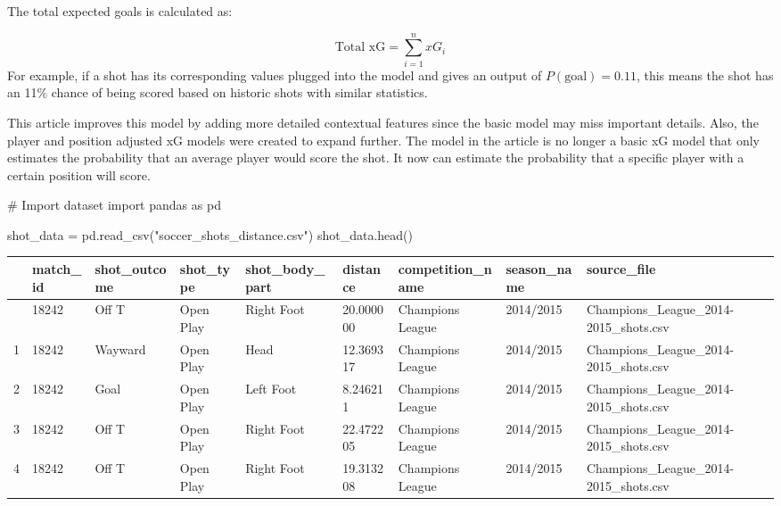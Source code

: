 \documentclass[
  11pt,
  letterpaper,
  DIV=11,
  numbers=noendperiod]{scrartcl}
\newenvironment{Shaded}{\begin{snugshade}}{\end{snugshade}}
\newcommand{\CommentTok}[1]{\textcolor[rgb]{0.37,0.37,0.37}{#1}}
\newcommand{\ImportTok}[1]{\textcolor[rgb]{0.00,0.46,0.62}{#1}}
\newcommand{\NormalTok}[1]{\textcolor[rgb]{0.00,0.23,0.31}{#1}}
\newcommand{\OperatorTok}[1]{\textcolor[rgb]{0.37,0.37,0.37}{#1}}
\newcommand{\StringTok}[1]{\textcolor[rgb]{0.13,0.47,0.30}{#1}}
\begin{document}
The total expected goals is calculated as:

\[
\text{Total xG} = \sum_{i=1}^{n} xG_i
\] For example, if a shot has its corresponding values plugged into the
model and gives an output of \(P(\text{goal}) = 0.11\), this means the
shot has an 11\% chance of being scored based on historic shots with
similar statistics.

This article improves this model by adding more detailed contextual
features since the basic model may miss important details. Also, the
player and position adjusted xG models were created to expand further.
The model in the article is no longer a basic xG model that only
estimates the probability that an average player would score the shot.
It now can estimate the probability that a specific player with a
certain position will score.

\begin{Shaded}
\begin{Highlighting}[]
\CommentTok{\# Import dataset}
\ImportTok{import}\NormalTok{ pandas }\ImportTok{as}\NormalTok{ pd}

\NormalTok{shot\_data }\OperatorTok{=}\NormalTok{ pd.read\_csv(}\StringTok{"soccer\_shots\_distance.csv"}\NormalTok{)}
\NormalTok{shot\_data.head()}
\end{Highlighting}
\end{Shaded}

\begin{longtable}[]{@{}lllllllll@{}}
\toprule\noalign{}
& match\_id & shot\_outcome & shot\_type & shot\_body\_part & distance &
competition\_name & season\_name & source\_file \\
\midrule\noalign{}
\endhead
\bottomrule\noalign{}
\endlastfoot
0 & 18242 & Off T & Open Play & Right Foot & 20.000000 & Champions
League & 2014/2015 & Champions\_League\_2014-2015\_shots.csv \\
1 & 18242 & Wayward & Open Play & Head & 12.369317 & Champions League &
2014/2015 & Champions\_League\_2014-2015\_shots.csv \\
2 & 18242 & Goal & Open Play & Left Foot & 8.246211 & Champions League &
2014/2015 & Champions\_League\_2014-2015\_shots.csv \\
3 & 18242 & Off T & Open Play & Right Foot & 22.472205 & Champions
League & 2014/2015 & Champions\_League\_2014-2015\_shots.csv \\
4 & 18242 & Off T & Open Play & Right Foot & 19.313208 & Champions
League & 2014/2015 & Champions\_League\_2014-2015\_shots.csv \\
\end{longtable}
\end{document}
